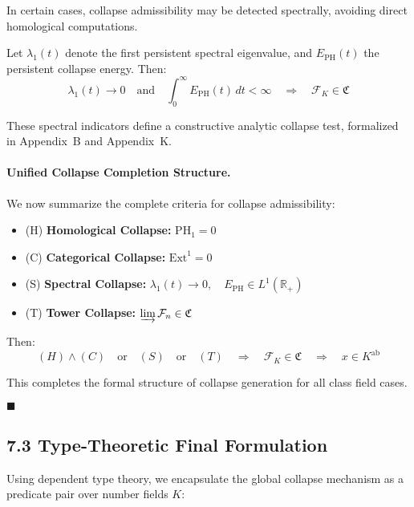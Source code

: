 \documentclass[11pt]{article}
\begin{document}
In certain cases, collapse admissibility may be detected spectrally, avoiding direct homological computations.

Let \( \lambda_1(t) \) denote the first persistent spectral eigenvalue, and \( E_{\mathrm{PH}}(t) \) the persistent collapse energy. Then:
\[
\boxed{
\lambda_1(t) \to 0 \quad \text{and} \quad \int_0^\infty E_{\mathrm{PH}}(t)\,dt < \infty
\quad \Rightarrow \quad
\mathcal{F}_K \in \mathfrak{C}
}
\]

These spectral indicators define a constructive analytic collapse test, formalized in Appendix~B and Appendix~K.

\vspace{1em}
\paragraph{Unified Collapse Completion Structure.}

We now summarize the complete criteria for collapse admissibility:

\begin{itemize}
    \item (H) \textbf{Homological Collapse:} \( \mathrm{PH}_1 = 0 \)
    \item (C) \textbf{Categorical Collapse:} \( \mathrm{Ext}^1 = 0 \)
    \item (S) \textbf{Spectral Collapse:} \( \lambda_1(t) \to 0, \quad E_{\mathrm{PH}} \in L^1(\mathbb{R}_+) \)
    \item (T) \textbf{Tower Collapse:} \( \varinjlim \mathcal{F}_n \in \mathfrak{C} \)
\end{itemize}

Then:
\[
(H) \wedge (C) \quad \text{or} \quad (S) \quad \text{or} \quad (T)
\quad \Longrightarrow \quad
\mathcal{F}_K \in \mathfrak{C} \quad \Rightarrow \quad x \in K^{\mathrm{ab}}
\]

This completes the formal structure of collapse generation for all class field cases.

\hfill $\blacksquare$



\subsection{7.3 Type-Theoretic Final Formulation}
\label{subsec:type-theoretic-final}

Using dependent type theory, we encapsulate the global collapse mechanism as a predicate pair over number fields \( K \):
\end{document}
